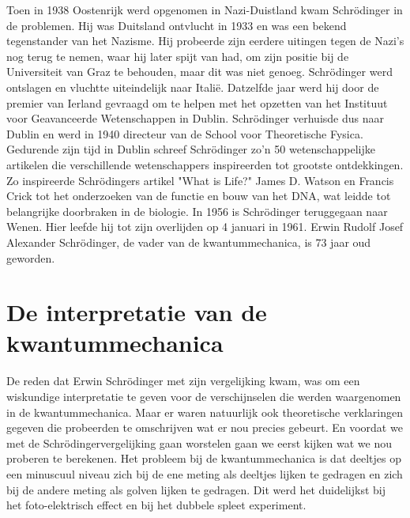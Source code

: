 \documentclass[11pt,fleqn]{book} %
\begin{document}
Toen in 1938 Oostenrijk werd opgenomen in Nazi-Duistland kwam Schrödinger in de problemen. Hij was Duitsland ontvlucht in 1933 en was een bekend tegenstander van het Nazisme. Hij probeerde zijn eerdere uitingen tegen de Nazi’s nog terug te nemen, waar hij later spijt van had, om zijn positie bij de Universiteit van Graz te behouden, maar dit was niet genoeg. Schrödinger werd ontslagen en vluchtte uiteindelijk naar Italië. Datzelfde jaar werd hij door de premier van Ierland gevraagd om te helpen met het opzetten van het Instituut voor Geavanceerde Wetenschappen in Dublin. Schrödinger verhuisde dus naar Dublin en werd in 1940 directeur van de School voor Theoretische Fysica. Gedurende zijn tijd in Dublin schreef Schrödinger zo’n 50 wetenschappelijke artikelen die verschillende wetenschappers inspireerden tot grootste ontdekkingen. Zo inspireerde Schrödingers artikel "What is Life?" James D. Watson en Francis Crick tot het onderzoeken van de functie en bouw van het DNA, wat leidde tot belangrijke doorbraken in de biologie.
In 1956 is Schrödinger teruggegaan naar Wenen. Hier leefde hij tot zijn overlijden op 4 januari in 1961. Erwin Rudolf Josef Alexander Schrödinger, de vader van de kwantummechanica, is 73 jaar oud geworden\cite{schr}.

\section{De interpretatie van de kwantummechanica}
De reden dat Erwin Schrödinger met zijn vergelijking kwam, was om een wiskundige interpretatie te geven voor de verschijnselen die werden waargenomen in de kwantummechanica. Maar er waren natuurlijk ook theoretische verklaringen gegeven die probeerden te omschrijven wat er nou precies gebeurt. En voordat we met de Schrödingervergelijking gaan worstelen gaan we eerst kijken wat we nou proberen te berekenen.
Het probleem bij de kwantummechanica is dat deeltjes op een minuscuul niveau zich bij de ene meting als deeltjes lijken te gedragen en zich bij de andere meting als golven lijken te gedragen. Dit werd het duidelijkst bij het foto-elektrisch effect en bij het dubbele spleet experiment.
\end{document}
